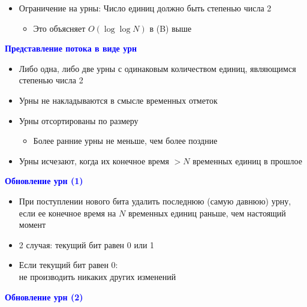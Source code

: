 \documentclass[landscape]{slides}
\begin{document}
\begin{normalsize}
\begin{slide}
\begin{itemize}
\item Ограничение на урны: 
Число единиц должно быть степенью числа 2

  \begin{itemize}
  \item Это объясняет $O(\log \log N)$  в (B) выше
  \end{itemize}
\end{itemize}
\end{slide}


\begin{slide}
\textbf{\textcolor{blue}{Представление потока в виде урн}}

\begin{itemize}
\item Либо одна, либо две урны с одинаковым количеством единиц, являющимся степенью числа 2

\item Урны не накладываются в смысле временных отметок

\item Урны отсортированы по размеру

  \begin{itemize}
  \item Более ранние урны не меньше, чем более поздние
  \end{itemize}

\item Урны исчезают, когда их конечное время $>N$
временных единиц в прошлое
\end{itemize}

\end{slide}


\begin{slide}
\textbf{\textcolor{blue}{Обновление урн (1)}}

\begin{itemize}
\item При поступлении нового бита удалить последнюю (самую давнюю) урну, если ее конечное время на $N$ временных единиц раньше, чем настоящий момент

\item 2 случая: текущий бит равен 0 или 1

\item Если текущий бит равен 0: \\
не производить никаких других изменений
\end{itemize}
\end{slide}


\begin{slide}
\textbf{\textcolor{blue}{Обновление урн (2)}}



\end{slide}
\end{normalsize}
\end{document}
